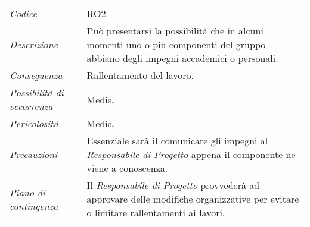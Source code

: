 {{{{{{	\begin{center}
		\renewcommand{\arraystretch}{1.4}
		\begin{longtable}{|p{5cm}|p{12cm}|}
			\hline
			\rowcolor{airforceblue}
			\multicolumn{2}{|c|}{\textit{Impegni personali}}\\
			\hline
			\textit{Codice} & RO2 \\
			\hline
			\textit{Descrizione} & Può presentarsi la possibilità che in alcuni momenti uno o più componenti del gruppo abbiano degli impegni accademici o personali. \\
			\hline
			\textit{Conseguenza} & Rallentamento del lavoro.\\
			\hline
			\textit{Possibilità di occorrenza} & Media. \\
			\hline
			\textit{Pericolosità} & Media. \\
			\hline
			\textit{Precauzioni} & Essenziale sarà il comunicare gli impegni al \textit{Responsabile di Progetto} appena il componente ne viene a conoscenza. \\
			\hline
			\textit{Piano di contingenza} & Il \textit{Responsabile di Progetto} provvederà ad approvare delle modifiche organizzative per evitare o limitare rallentamenti ai lavori. \\
			\hline
		\end{longtable}
	\end{center}

\def\tabularxcolumn#1{m{#1}}
{
	
}}}}}}}
